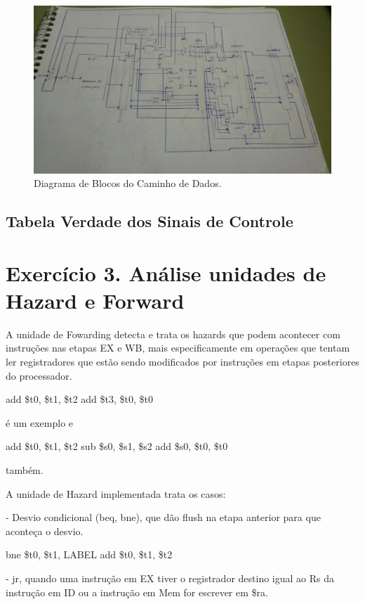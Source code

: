 \documentclass[12pt]{article}
\begin{document}
\begin{figure}[H]
	\flushleft
	\includegraphics[width=1\textwidth]{caminho_de_dados.jpg}
	\caption{Diagrama de Blocos do Caminho de Dados.}
	\label{fig:pfunct}
\end{figure}

\subsection{Tabela Verdade dos Sinais de Controle}

\section{Exercício 3. Análise unidades de Hazard e Forward}
\label{sec:hazardforward}

A unidade de Fowarding detecta e trata os hazards que podem acontecer com instruções nas etapas EX e WB, mais especificamente em operações que tentam ler registradores que estão sendo modificados por instruções em etapas posteriores do processador.

 add \$t0, \$t1, \$t2 
 add \$t3, \$t0, \$t0 

é um exemplo e

 add \$t0, \$t1, \$t2 
 sub \$s0, \$s1, \$s2 
 add \$s0, \$t0, \$t0 

também.

A unidade de Hazard implementada trata os casos:

-  Desvio condicional (beq, bne), que dão flush na etapa anterior para que aconteça o desvio.

 bne \$t0, \$t1, LABEL
 add \$t0, \$t1, \$t2

- jr, quando uma instrução em EX tiver o registrador destino igual ao Rs da instrução em ID ou a instrução em Mem for escrever em \$ra.
\end{document}
